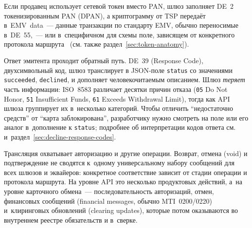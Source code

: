 Если продавец использует сетевой токен вместо PAN, шлюз заполняет
DE~2 токенизированным PAN (DPAN), а криптограмму от TSP
передаёт в~EMV~data~--- данные транзакции по стандарту EMV,
обычно переносимые в~DE~55,~--- или в~специфичном для схемы поле,
зависящем от конкретного протокола
маршрута~\cite{emvco-payment-tokenisation-guide}
(см. также раздел~\ref{sec:token-anatomy}).

Ответ эмитента проходит обратный путь. DE~39 (Response Code),
двухсимвольный код, шлюз транслирует в JSON-поле
\texttt{status} со значениями \texttt{succeeded}, \texttt{declined},
 и дополняет человекочитаемым
описанием. Шлюз \emph{теряет} часть
информации: ISO~8583 различает десятки причин отказа
(\texttt{05} Do Not Honor, \texttt{51} Insufficient Funds,
\texttt{61} Exceeds Withdrawal Limit), тогда как API шлюза группирует их
в~несколько категорий. Чтобы отличить
\enquote{недостаточно средств} от \enquote{карта заблокирована},
разработчику нужно смотреть на поле 
или его аналог в~дополнение к \texttt{status};
подробнее об интерпретации кодов ответа см.~\cite{mc-tpr}
и~раздел~\ref{sec:decline-response-codes}.


Трансляция охватывает авторизацию и другие операции. Возврат, отмена (void)
и подтверждение не сводятся к~одному универсальному набору сообщений
для всех шлюзов и эквайеров: конкретное соответствие зависит
от стадии операции и протокола маршрута. На уровне API
это несколько продуктовых действий, а~на уровне карточного
обмена~--- последовательность авторизаций, отмен, финансовых
сообщений (financial messages, обычно MTI~0200/0220) и~клиринговых
обновлений (clearing updates), которые потом оказываются
во внутреннем реестре обязательств и в~сверке.
